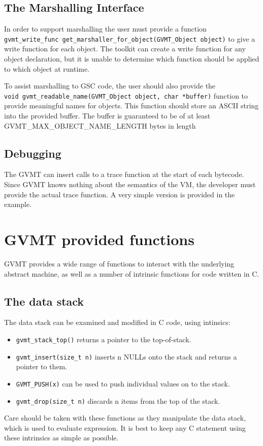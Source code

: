 \subsection{The Marshalling Interface}
In order to support marshalling the user must provide a function \\
\verb|gvmt_write_func get_marshaller_for_object(GVMT_Object object)| to give a write function for each object. The toolkit can create a write function for any object declaration, but it is unable to determine which function should be applied to which object at runtime. 

To assist marshalling to GSC code, the user should also provide the \\
\verb|void gvmt_readable_name(GVMT_Object object, char *buffer)| function to provide meaningful names for objects.
This function should store an ASCII string into the provided buffer. The buffer is guaranteed to be of at least GVMT\_MAX\_OBJECT\_NAME\_LENGTH bytes in length 

\subsection{Debugging}
The GVMT can insert calls to a trace function at the start of each bytecode. Since GVMT knows nothing about the semantics of the VM, the developer must provide the actual trace function. A very simple version is provided in the example.

\section{GVMT provided functions}
GVMT provides a wide range of functions to interact with the underlying abstract machine, as well as a number of intrinsic functions for code written in C.

\subsection{The data stack}
The data stack can be examined and modified in C code, using intinsics:
\begin{itemize}
\item \verb|gvmt_stack_top()| returns a pointer to the top-of-stack.
\item \verb|gvmt_insert(size_t n)| inserts n NULLs onto the stack and returns a pointer to them.
\item \verb|GVMT_PUSH(x)| can be used to push individual values on to the stack.
\item \verb|gvmt_drop(size_t n)| discards n items from the top of the stack.
\end{itemize}
Care should be taken with these functions as they manipulate the data stack, which is used to evaluate expression. It is best to keep any C statement using these intrinsics as simple as possible.

